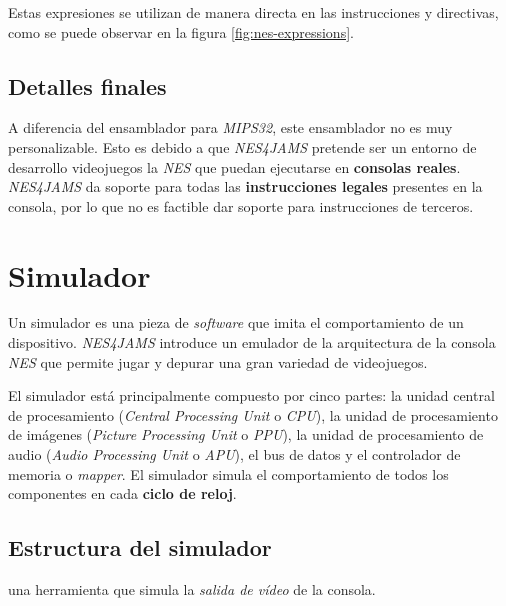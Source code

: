 Estas expresiones se utilizan de manera directa en las
instrucciones y directivas, como se puede observar en
la figura \ref{fig:nes-expressions}.

\subsection{Detalles finales}\label{subsec:detalles-finales}

A diferencia del ensamblador para \textit{MIPS32},
este ensamblador no es muy personalizable.
Esto es debido a que \textit{NES4JAMS} pretende
ser un entorno de desarrollo  videojuegos  la \textit{NES}
que puedan ejecutarse en \textbf{consolas reales}.
\textit{NES4JAMS} da soporte para todas las
\textbf{instrucciones legales} presentes en la consola,
por lo que no es factible dar soporte para instrucciones
de terceros.


\section{Simulador}\label{sec:simulador}

Un simulador es una pieza de \textit{software} que imita el
comportamiento de un dispositivo.
\textit{NES4JAMS} introduce un emulador de la arquitectura
de la consola \textit{NES} que permite jugar y depurar
una gran variedad de videojuegos.

El simulador está principalmente compuesto por cinco partes:
la unidad central de procesamiento
(\textit{Central Processing Unit} o \textit{CPU}),
la unidad de procesamiento de imágenes
(\textit{Picture Processing Unit} o \textit{PPU}),
la unidad de procesamiento de audio
(\textit{Audio Processing Unit} o \textit{APU}),
el bus de datos y el controlador de memoria o \textit{mapper}.
El simulador simula el comportamiento de todos los componentes
en cada \textbf{ciclo de reloj}.

\subsection{Estructura del simulador}\label{subsec:estructura-del-simulador}

 una herramienta que
simula la \textit{salida de vídeo} de la consola.


